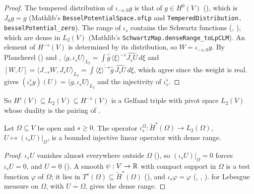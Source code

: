 \begin{proof}
\leanok
The tempered distribution of $\iota_{-s,0} g$ is that of $g \in H^0(V)$
(), which is $J_0 g = g$ (Mathlib's
\texttt{BesselPotentialSpace.\allowbreak ofLp} and \texttt{TemperedDistribution.\allowbreak
besselPotential\_\allowbreak zero}). The range of $\iota_s$ contains the Schwartz functions
(, ), which are dense in $L_2(V)$
(Mathlib's \texttt{SchwartzMap.\allowbreak denseRange\_\allowbreak toLpCLM}). An element of
$H^{-s}(V)$ is determined by its distribution, so $W = \iota_{-s,0} g$. By Plancherel
() and ,
$\langle g, \iota_s U \rangle_{L_2} = \int \overline{\widehat g} \, \langle \xi \rangle^{-s}
\widehat{J_s U} \, d\xi$ and $[W, U] = \langle J_{-s} W, J_s U \rangle_{L_2} =
\int \overline{\langle \xi \rangle^{-s} \widehat g} \, \widehat{J_s U} \, d\xi$, which agree since
the weight is real.  gives
$(\iota_s^\flat g)(U) = \langle g, \iota_s U \rangle_{L_2}$ and the injectivity of
$\iota_s^\flat$.
\end{proof}

So $H^s(V) \subseteq L_2(V) \subseteq H^{-s}(V)$ is a Gelfand triple with pivot space $L_2(V)$
whose duality is the pairing of .

\begin{lemma}
\label{lem:tilde-dense-l2}
\leanok
{}
Let $\Omega \subseteq V$ be open and $s \geq 0$. The operator
$\iota^\Omega_s : \tilde H^s(\Omega) \to L_2(\Omega)$, $U \mapsto (\iota_s U)|_\Omega$, is a
bounded injective linear operator with dense range.
\end{lemma}

\begin{proof}
\leanok
$\iota_s U$ vanishes almost everywhere outside $\Omega$
(), so $(\iota_s U)|_\Omega = 0$ forces
$\iota_s U = 0$, and $U = 0$ (). A smooth $\psi : V \to \mathbb{R}$ with compact
support in $\Omega$ is a test function $\varphi$ of $\Omega$; it lies in
$T^s(\Omega) \subseteq \tilde H^s(\Omega)$ (), and
$\iota_s \varphi = \varphi$ (, ,
).
 for Lebesgue measure on $\Omega$, with $U = \Omega$, gives the dense
range.
\end{proof}

